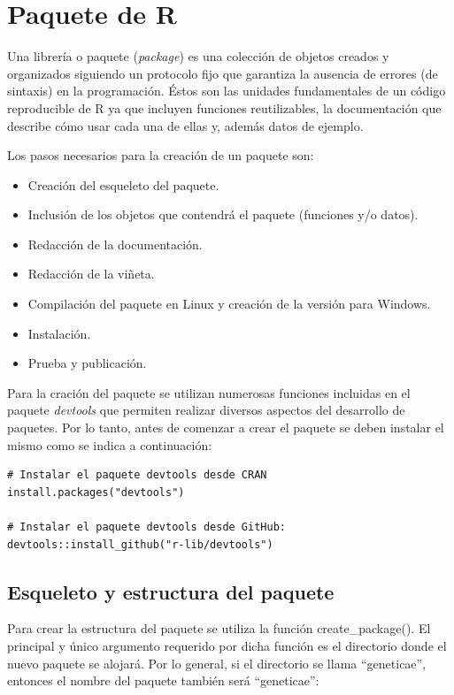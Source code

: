 \section{Paquete de R}

Una librería o paquete (\emph{package}) es una colección de objetos creados y organizados siguiendo un protocolo fijo que garantiza la ausencia de errores (de sintaxis) en la programación. Éstos son las unidades fundamentales de un código reproducible de R ya que incluyen funciones reutilizables, la documentación que describe cómo usar cada una de ellas y, además datos de ejemplo. 

Los pasos necesarios para la creación de un paquete son:
\begin{itemize}
\item Creación del esqueleto del paquete.
\item Inclusión de los objetos que contendrá el paquete (funciones y/o datos).
\item Redacción de la documentación.
\item Redacción de la viñeta.
\item Compilación del paquete en Linux y creación de la versión para Windows.
\item Instalación.
\item Prueba y publicación.
\end{itemize}


Para la cración del paquete se utilizan numerosas funciones incluidas en el paquete \emph{devtools} que permiten realizar diversos aspectos del desarrollo de paquetes. Por lo tanto, antes de comenzar a crear el paquete se deben instalar el mismo como se indica a continuación:\\

\begin{lstlisting}
# Instalar el paquete devtools desde CRAN
install.packages("devtools")

# Instalar el paquete devtools desde GitHub:
devtools::install_github("r-lib/devtools")
\end{lstlisting}

\subsection{Esqueleto y estructura del paquete}

Para crear la estructura del paquete se utiliza la función create\_package(). El principal y único argumento requerido por dicha función es el directorio donde el nuevo paquete se alojará. Por lo general, si el directorio se llama ``geneticae'', entonces el nombre del paquete también será ``geneticae'':


